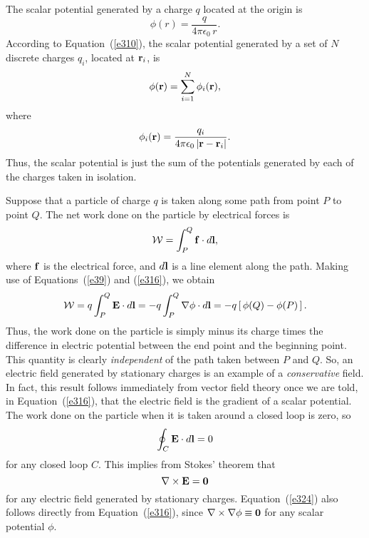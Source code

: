 The scalar potential generated by a charge $q$ located at the origin is
\begin{equation}
\phi( r) = \frac{q}{4\pi\epsilon_0\,r}.
\end{equation}
According to Equation~(\ref{e310}), the scalar potential generated by a set of $N$
discrete charges $q_i$, located at ${\bf r}_i$, is
\begin{equation}
\phi({\bf r}) = \sum_{i=1}^N \phi_i ({\bf r}),
\end{equation}
where
\begin{equation}\label{e320}
\phi_i({\bf r}) = \frac{q_i}{4\pi\epsilon_0\,|{\bf r} - {\bf r}_i|}.
\end{equation}
Thus,  the scalar potential is just the sum of the potentials generated by each
of the charges taken in isolation.

Suppose that a particle of
charge $q$ is taken along some path from point $P$ to point $Q$.
The net work done on the particle by electrical forces is 
\begin{equation}
{\cal W} = \int_P^Q {\bf f}\cdot d{\bf l},
\end{equation}
where ${\bf f}$ is the electrical force, and $d{\bf l}$ is a line element along the
path. Making use of Equations~(\ref{e39}) and (\ref{e316}), we obtain
\begin{equation}\label{e322}
{\cal W} = q \int_P^Q {\bf E}\cdot d{\bf l} = - q\int_P^Q \nabla\phi\cdot d{\bf l}
= -q \left[\,\phi(Q)- \phi(P)\,\right].
\end{equation}
Thus, the work done on the particle is simply minus its charge times the difference
in electric potential between the end point and the beginning point. This quantity
is clearly {\em independent}\/ of the path taken between $P$ and $Q$. So, an electric field
generated by stationary charges is an example of a {\em conservative}\/ field. In fact, this
result follows immediately from vector field theory once we are told,
in Equation~(\ref{e316}),  that the electric field
is the gradient of a scalar potential. The work done on the particle
when it is taken around a closed loop is zero, so
\begin{equation}
\oint_C {\bf E}\cdot d{\bf l} = 0
\end{equation}
for any closed loop $C$. This implies from Stokes' theorem that
\begin{equation}\label{e324}
\nabla\times {\bf E} = {\bf 0}
\end{equation}
for any electric field generated by stationary charges. Equation~(\ref{e324})
also follows directly 
from Equation~(\ref{e316}), since $\nabla\times\nabla \phi \equiv {\bf 0}$ for any scalar potential
$\phi$. 

